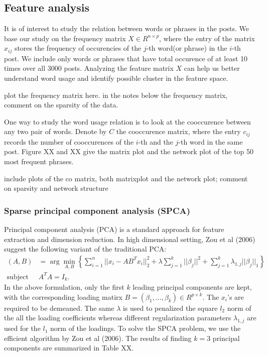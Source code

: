 \documentclass[11pt]{article}
\newcommand{\1}[1]{{\mathbf 1}\left\{#1\right\}}        %
\begin{document}
\subsection{Feature analysis}
It is of interest to study the relation between words or phrases in the posts. We base our study on the frequency matrix $X\in R^{n\times p}$, where the entry of the matrix $x_{ij}$ stores the frequency of occurencies of the $j$-th word(or phrase) in the $i$-th post. We include only words or phrases that have total occurence of at least 10 times over all 3000 posts. Analyzing the feature matrix $X$ can help us better understand word usage and identify possible cluster in the feature space. 

plot the frequency matrix here. in the notes below the frequency matrix, comment on the sparsity of the data.

One way to study the word usage relation is to look at the cooccurence between any two pair of words. Denote by $C$ the cooccurence matrix, where the entry $c_{ij}$ records the number of cooccurences of the $i$-th and the $j$-th word in the same post. Figure XX and XX give the matrix plot and the network plot of the top 50 most frequent phrases. 

include plots of the co matrix, both matrixplot and the network plot; comment on sparsity and network structure 

\subsubsection{Sparse principal component analysis (SPCA)}
Principal component analysis (PCA) is a standard approach for feature extraction and dimension reduction. In high dimensional setting, Zou et al (2006) suggest the following variant of the traditional PCA:
\begin{align}
(A,B) & = \arg \min_{A,B} \left \{ \sum_{i=1}^n||x_i-AB^Tx_i||_2^2 + \lambda \sum_{j=1}^k||\beta_j||^2 + \sum_{j=1}^k\lambda_{1,j}||\beta_j||_1 \right\} \\ 
\text{subject to } & A^TA = I_{k}. \nonumber
\end{align}
In the above formulation, only the first $k$ leading principal components are kept, with the corresponding loading matirx $B = (\beta_1,...,\beta_k) \in R^{p\times k}$. The $x_i$'s are required to be demeaned. The same $\lambda$ is used to penalized the square $l_2$ norm of the all the loading coefficients whereas different regularization parameters $\lambda_{1,j}$ are used for the $l_1$ norm of the loadings. To solve the SPCA problem, we use the efficient algorithm by Zou et al (2006). The results of finding $k=3$ principal components are summarized in Table XX.
\end{document}
